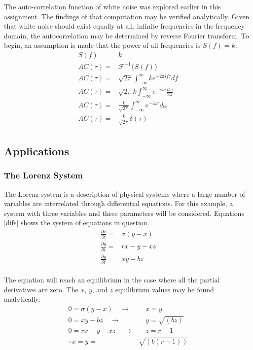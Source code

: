 \documentclass[twocolumn]{article}
\begin{document}
The auto-correlation function of white noise was explored earlier in this assignment. The findings of that computation may be verified analytically. Given that white noise should exist equally at all, infinite frequencies in the frequency domain, the autocorrelation may be determined by reverse Fourier transform. To begin, an assumption is made that the power of all frequencies is $S(f) = k$.
\begin{equation}
\begin{split}
S(f) =& k \\
AC(\tau) =& \mathcal{F}^{-1} \{ S(f) \} \\
AC(\tau) =& \sqrt{2\pi} \int_{-\infty}^{\infty} k e^{-2\pi i f \tau} df \\
AC(\tau) =& \sqrt{2\pi}k \int_{-\infty}^{\infty} e^{- i \omega \tau} \frac{d\omega}{2\pi} \\
AC(\tau) =& \frac{k}{\sqrt{2\pi}} \int_{-\infty}^{\infty} e^{- i \omega \tau} d\omega \\
AC(\tau) =& \frac{k}{\sqrt{2\pi}} \delta(\tau) \\
\end{split}
\end{equation}
\subsection{Applications}
\subsubsection{The Lorenz System}
The Lorenz system is a description of physical systems where a large number of variables are interrelated through differential equations. For this example, a system with three variables and three parameters will be considered. Equations \ref{difs} shows the system of equations in question.
\begin{equation} \label{difs}
\begin{split}
\frac{\partial x}{\partial t} =& \sigma (y - x) \\
\frac{\partial y}{\partial t} =& rx - y - xz \\
\frac{\partial y}{\partial t} =& xy - bz \\
\end{split}
\end{equation}

The equation will reach an equilibrium in the case where all the partial derivatives are zero. The $x$, $y$, and $z$ equilibrium values may be found analytically:
\begin{equation} \label{equilibrium}
\begin{split}
0 = \sigma (y - x) \quad \to  & \quad x = y\\
0 = xy - bz \quad \to & \quad y = \sqrt{(bz)}\\
0 = rx - y - xz \quad \to & \quad z = r-1\\
\therefore x = y =& \sqrt{(b(r-1))}
\end{split}
\end{equation}
\end{document}
